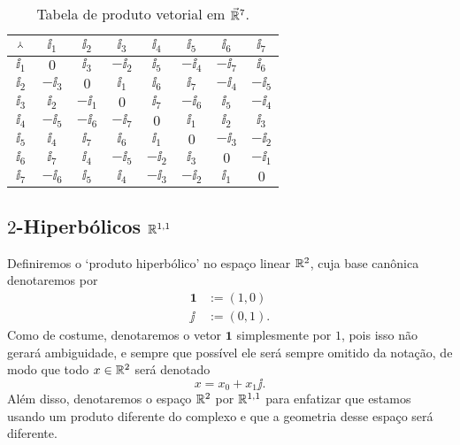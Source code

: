 \begin{table}
	\centering

	\begin{tabular}{c | c c c c c c c}
	\toprule
	${} \Yup {}$&	$\ii_1$	&	$\ii_2$	&	$\ii_3$	&	$\ii_4$	&	$\ii_5$	&	$\ii_6$	&	$\ii_7$		\\
	\hline
	$\ii_1$	&	$0$		&	$\ii_3$	&	$-\ii_2$&	$\ii_5$	&	$-\ii_4$&	$-\ii_7$&	$\ii_6$		\\
	$\ii_2$	&	$-\ii_3$&	$0$		&	$\ii_1$	&	$\ii_6$	&	$\ii_7$	&	$-\ii_4$&	$-\ii_5$	\\
	$\ii_3$	&	$\ii_2$	&	$-\ii_1$&	$0$		&	$\ii_7$	&	$-\ii_6$&	$\ii_5$	&	$-\ii_4$	\\
	$\ii_4$	&	$-\ii_5$&	$-\ii_6$&	$-\ii_7$&	$0$		&	$\ii_1$	&	$\ii_2$	&	$\ii_3$		\\
	$\ii_5$	&	$\ii_4$	&	$\ii_7$	&	$\ii_6$	&	$\ii_1$	&	$0$		&	$-\ii_3$&	$-\ii_2$	\\
	$\ii_6$	&	$\ii_7$	&	$\ii_4$	&	$-\ii_5$&	$-\ii_2$&	$\ii_3$	&	$0$		&	$-\ii_1$	\\
	$\ii_7$	&	$-\ii_6$&	$\ii_5$	&	$\ii_4$	&	$-\ii_3$&	$-\ii_2$&	$\ii_1$	&	$0$			\\
	\bottomrule
	\end{tabular}

	\caption{Tabela de produto vetorial em $\vec{\mathbb{R}}^7$.}
	\label{tab:multiplicacao.octonionica.vetorial}
\end{table}


















\subsection{$2$-Hiperbólicos \ensuremath{\R^{1,1}}}

Definiremos o `produto hiperbólico' no espaço linear $\mathbb{R}^2$, cuja base canônica denotaremos por
	\begin{align*}
	\bm 1 &:= (1,0) \\
	\jj &:= (0,1).
	\end{align*}
Como de costume, denotaremos o vetor $\bm 1$ simplesmente por $1$, pois isso não gerará ambiguidade, e sempre que possível ele será sempre omitido da notação, de modo que todo $x \in \mathbb{R}^2$ será denotado
	\begin{equation*}
	x = x_0 + x_1 \jj.
	\end{equation*}
Além disso, denotaremos o espaço $\mathbb{R}^2$ por $\mathbb{R}^{1,1}$ para enfatizar que estamos usando um produto diferente do complexo e que a geometria desse espaço será diferente.

